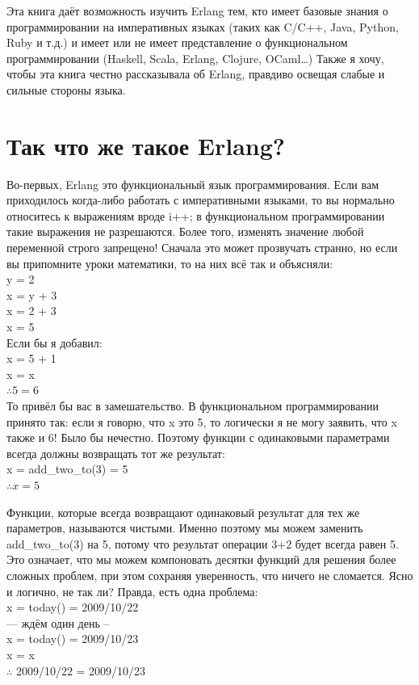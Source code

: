 \documentclass[a4paper,12pt]{report}
\newcommand{\ops}{\colorbox{lgreen}}
\begin{document}
Эта книга даёт возможность изучить Erlang тем, кто имеет базовые знания о программировании на императивных языках (таких как C/C++, Java, Python, Ruby и т.д.) и имеет или не имеет представление о функциональном программировании (Haskell, Scala, Erlang, Clojure, OCaml\ldots) Также я хочу, чтобы эта книга честно рассказывала об Erlang, правдиво освещая слабые и сильные стороны языка.

\section{Так что же такое Erlang?}
Во\--первых, Erlang это функциональный язык программирования. Если вам приходилось когда\--либо работать с императивными языками, то вы нормально относитесь к выражениям вроде \ops{i++;} в функциональном программировании такие выражения не разрешаются. Более того, изменять значение любой переменной строго запрещено! Сначала это может прозвучать странно, но если вы припомните уроки математики, то на них всё так и объясняли:\\ 
y = 2\\ 
x = y + 3\\ 
x = 2 + 3\\ 
x = 5\\ 
Если бы я добавил:\\ 
x = 5 + 1\\ 
x = x\\ 
$\therefore 5 = 6$\\ 

То привёл бы вас в замешательство. В функциональном программировании принято так: если я говорю, что x это 5, то логически я не могу заявить, что x также и 6! Было бы нечестно. Поэтому функции с одинаковыми параметрами всегда должны возвращать тот же результат:\\  
x = add\_two\_to(3) = 5\\ 
$\therefore x = 5$
 
Функции, которые  всегда возвращают одинаковый результат для тех же параметров, называются чистыми. Именно поэтому мы можем заменить  \ops{add\_two\_to(3)} на 5, потому что результат операции \ops{3+2} будет всегда равен 5. Это означает, что мы можем компоновать десятки функций для решения более сложных проблем, при этом сохраняя уверенность, что ничего не сломается. Ясно и логично, не так ли? Правда, есть одна проблема:\\ 
x = today() = 2009/10/22\\ 
--- ждём один день --\\ 
x = today() = 2009/10/23\\ 
x = x\\ 
$\therefore$ 2009/10/22 = 2009/10/23 
\end{document}
